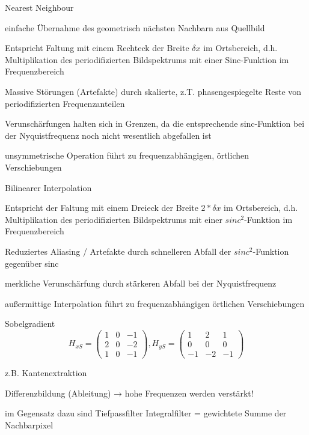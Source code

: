 \documentclass[landscape]{article}
\begin{document}
\begin{multicols}{3}
\begin{description*}
\begin{itemize*}
\begin{center}
      \end{center}
    \end{itemize*}
    \item[Nearest Neighbour]
    \begin{itemize*}
      \item einfache Übernahme des geometrisch nächsten Nachbarn aus Quellbild
      \item Entspricht Faltung mit einem Rechteck der Breite $\delta x$ im Ortsbereich, d.h. Multiplikation des periodifizierten Bildspektrums mit einer Sinc-Funktion im Frequenzbereich
      \item Massive Störungen (Artefakte) durch skalierte, z.T. phasengespiegelte Reste von periodifizierten Frequenzanteilen
      \item Verunschärfungen halten sich in Grenzen, da die entsprechende sinc-Funktion bei der Nyquistfrequenz noch nicht wesentlich abgefallen ist
      \item unsymmetrische Operation führt zu frequenzabhängigen, örtlichen Verschiebungen
    \end{itemize*}
    \item[Bilinearer Interpolation]
    \begin{itemize*}
      \item Entspricht der Faltung mit einem Dreieck der Breite $2*\delta x$ im Ortsbereich, d.h. Multiplikation des periodifizierten Bildspektrums mit einer $sinc^2$-Funktion im Frequenzbereich
      \item Reduziertes Aliasing / Artefakte durch schnelleren Abfall der $sinc^2$-Funktion gegenüber sinc
      \item merkliche Verunschärfung durch stärkeren Abfall bei der Nyquistfrequenz
      \item außermittige Interpolation führt zu frequenzabhängigen örtlichen Verschiebungen
    \end{itemize*}
    \item[Sobelgradient] $$H_{xS} =\begin{pmatrix} 1&0&-1\\ 2&0&-2\\ 1&0&-1\end{pmatrix}, H_{yS}=\begin{pmatrix} 1&2&1\\ 0&0&0\\ -1&-2&-1 \end{pmatrix}$$
    \begin{itemize*}
      \item z.B. Kantenextraktion
      \item Differenzbildung (Ableitung) → hohe Frequenzen werden verstärkt!
      \item im Gegensatz dazu sind Tiefpassfilter Integralfilter = gewichtete Summe der Nachbarpixel
    \end{itemize*} 
  \end{description*}
  
  
\end{multicols}
\end{document}
